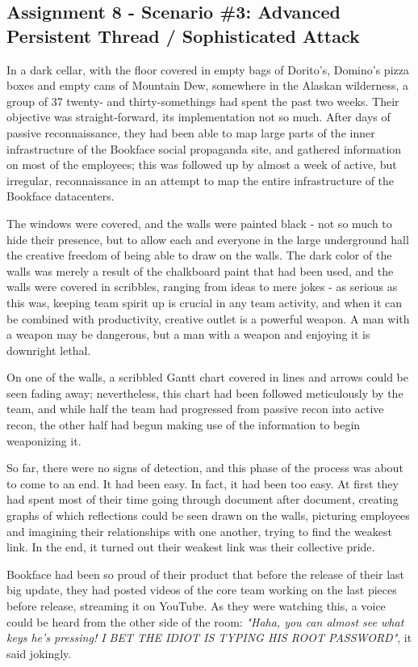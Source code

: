 \subsection{Assignment 8 - Scenario \#3: Advanced Persistent Thread / Sophisticated Attack}
In a dark cellar, with the floor covered in empty bags of Dorito's, Domino's pizza boxes and empty cans of Mountain Dew, somewhere in the Alaskan wilderness, a group of 37 twenty- and thirty-somethings had spent the past two weeks. Their objective was straight-forward, its implementation not so much. After days of passive reconnaissance, they had been able to map large parts of the inner infrastructure of the Bookface social propaganda site, and gathered information on most of the employees; this was followed up by almost a week of active, but irregular, reconnaissance in an attempt to map the entire infrastructure of the Bookface datacenters. 

The windows were covered, and the walls were painted black - not so much to hide their presence, but to allow each and everyone in the large underground hall the creative freedom of being able to draw on the walls. The dark color of the walls was merely a result of the chalkboard paint that had been used, and the walls were covered in scribbles, ranging from ideas to mere jokes - as serious as this was, keeping team spirit up is crucial in any team activity, and when it can be combined with productivity, creative outlet is a powerful weapon. A man with a weapon may be dangerous, but a man with a weapon and enjoying it is downright lethal. 

On one of the walls, a scribbled Gantt chart covered in lines and arrows could be seen fading away; nevertheless, this chart had been followed meticulously by the team, and while half the team had progressed from passive recon into active recon, the other half had begun making use of the information to begin weaponizing it. 

So far, there were no signs of detection, and this phase of the process was about to come to an end. It had been easy. In fact, it had been too easy. At first they had spent most of their time going through document after document, creating graphs of which reflections could be seen drawn on the walls, picturing employees and imagining their relationships with one another, trying to find the weakest link. In the end, it turned out their weakest link was their collective pride. 

Bookface had been so proud of their product that before the release of their last big update, they had posted videos of the core team working on the last pieces before release, streaming it on YouTube. As they were watching this, a voice could be heard from the other side of the room: \textit{"Haha, you can almost see what keys he's pressing! I BET THE IDIOT IS TYPING HIS ROOT PASSWORD"}, it said jokingly. 

